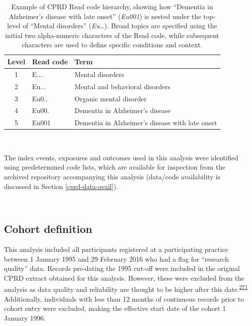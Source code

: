 \documentclass[a4paper, twoside]{templates/ociamthesis}
\begin{document}
\begin{table}[H]

\caption[Example of CPRD Read code hierarchy]{\label{tab:readExample-table}Example of CPRD Read code hierarchy, showing how ``Dementia in Alzheimer's disease with late onset'' (\emph{Eu001}) is nested under the top-level of ``Mental disorders'' (\emph{Eu\ldots{}}). Broad topics are specified using the initial two alpha-numeric characters of the Read code, while subsequent characters are used to define specific conditions and context.}
\centering
\begin{tabular}[t]{cll}
\toprule
\textbf{Level} & \textbf{Read code} & \textbf{Term}\\
\midrule
1 & E.... & Mental disorders\\
2 & Eu... & Mental and behavioral disorders\\
3 & Eu0.. & Organic mental disorder\\
4 & Eu00. & Dementia in Alzheimer's disease\\
5 & Eu001 & Dementia in Alzheimer's disease with late onset\\
\bottomrule
\end{tabular}
\end{table}

~

The index events, exposures and outcomes used in this analysis were identified using predetermined code lists, which are available for inspection from the archived repository accompanying this analysis (data/code availability is discussed in Section \ref{cprd-data-avail}).

~

\hypertarget{cohort-definition}{%
\subsection{Cohort definition}\label{cohort-definition}}

This analysis included all participants registered at a participating practice between 1 January 1995 and 29 February 2016 who had a flag for ``research quality'' data. Records pre-dating the 1995 cut-off were included in the original CPRD extract obtained for this analysis. However, these were excluded from the analysis as data quality and reliability are thought to be higher after this date.\textsuperscript{\protect\hyperlink{ref-wolf2019}{271}} Additionally, individuals with less than 12 months of continuous records prior to cohort entry were excluded, making the effective start date of the cohort 1 January 1996.
\end{document}
